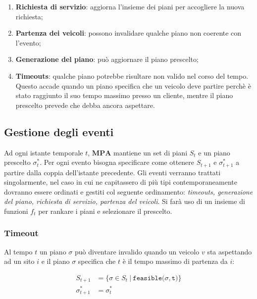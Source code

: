 \documentclass[
]{article}
\providecommand{\tightlist}{%
  \setlength{\itemsep}{0pt}\setlength{\parskip}{0pt}}
\begin{document}
\begin{enumerate}
\tightlist
\item
  \textbf{Richiesta di servizio}: aggiorna l'insieme dei piani per
  accogliere la nuova richiesta;
\item
  \textbf{Partenza dei veicoli}: possono invalidare qualche piano non
  coerente con l'evento;
\item
  \textbf{Generazione del piano}: può aggiornare il piano prescelto;
\item
  \textbf{Timeouts}: qualche piano potrebbe risultare non valido nel
  corso del tempo. Questo accade quando un piano specifica che un
  veicolo deve partire perchè è stato raggiunto il suo tempo massimo
  presso un cliente, mentre il piano prescelto prevede che debba ancora
  aspettare.
\end{enumerate}

\hypertarget{gestione-degli-eventi}{%
\subsection{Gestione degli eventi}\label{gestione-degli-eventi}}

Ad ogni istante temporale {\(t\)}, {\(\mathbf{MPA}\)} mantiene un set di
piani {\(S_{t}\)} e un piano prescelto {\(\sigma_{t}^{\ast}\)}. Per ogni
evento bisogna specificare come ottenere {\(S_{t + 1}\)} e
{\(\sigma_{t + 1}^{\ast}\)} a partire dalla coppia dell'istante
precedente. Gli eventi verranno trattati singolarmente, nel caso in cui
ne capitassero di più tipi contemporaneamente dovranno essere ordinati e
gestiti col seguente ordinamento: \emph{timeouts, generazione del piano,
richiesta di servizio, partenza del veicoli}. Si farà uso di un insieme
di funzioni {\(f_{t}\)} per rankare i piani e selezionare il prescelto.

\hypertarget{timeout}{%
\subsubsection{Timeout}\label{timeout}}

Al tempo {\(t\)} un piano {\(\sigma\)} può diventare invalido quando un
veicolo {\(v\)} sta aspettando ad un sito {\(i\)} e il piano
{\(\sigma\)} specifica che {\(t\)} è il tempo massimo di partenza da
{\(i\)}:

\begin{equation*}
    \begin{split}
        S_{t + 1} & {= \{\sigma \in S_{t}\ |\ \texttt{feasible(}\sigma,\texttt{t)}\}} \\
\sigma_{t + 1}^{\ast} & {= \sigma_{t}^{\ast}} \\
    \end{split}
\end{equation*}
\end{document}

